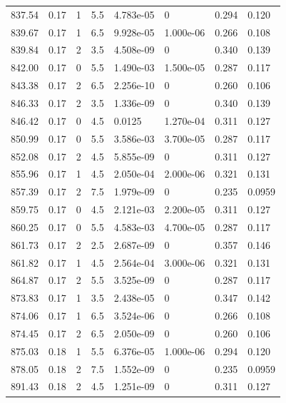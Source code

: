 \documentclass[preview]{standalone}
\begin{document}
{{{{{{{{{\begin{tabular}{L{1.2cm}C{1.2cm} C{0.3cm}C{0.5cm} C{1.4cm}C{1.4cm} C{1.4cm}C{1.4cm}}
  837.54  &  0.17  & 1     & 5.5 &  4.783e-05  & 0  & 0.294 &  0.120   \\ 
  839.67  &  0.17  & 1     & 6.5 &  9.928e-05  & 1.000e-06  & 0.266 &  0.108   \\ 
  839.84  &  0.17  & 2     & 3.5 &  4.508e-09  & 0  & 0.340 &  0.139   \\ 
  842.00  &  0.17  & 0     & 5.5 &  1.490e-03  & 1.500e-05  & 0.287 &  0.117   \\ 
  843.38  &  0.17  & 2     & 6.5 &  2.256e-10  & 0  & 0.260 &  0.106   \\ 
  846.33  &  0.17  & 2     & 3.5 &  1.336e-09  & 0  & 0.340 &  0.139   \\ 
  846.42  &  0.17  & 0     & 4.5 &  0.0125  & 1.270e-04  & 0.311 &  0.127   \\ 
  850.99  &  0.17  & 0     & 5.5 &  3.586e-03  & 3.700e-05  & 0.287 &  0.117   \\ 
  852.08  &  0.17  & 2     & 4.5 &  5.855e-09  & 0  & 0.311 &  0.127   \\ 
  855.96  &  0.17  & 1     & 4.5 &  2.050e-04  & 2.000e-06  & 0.321 &  0.131   \\ 
  857.39  &  0.17  & 2     & 7.5 &  1.979e-09  & 0  & 0.235 &  0.0959   \\ 
  859.75  &  0.17  & 0     & 4.5 &  2.121e-03  & 2.200e-05  & 0.311 &  0.127   \\ 
  860.25  &  0.17  & 0     & 5.5 &  4.583e-03  & 4.700e-05  & 0.287 &  0.117   \\ 
  861.73  &  0.17  & 2     & 2.5 &  2.687e-09  & 0  & 0.357 &  0.146   \\ 
  861.82  &  0.17  & 1     & 4.5 &  2.564e-04  & 3.000e-06  & 0.321 &  0.131   \\ 
  864.87  &  0.17  & 2     & 5.5 &  3.525e-09  & 0  & 0.287 &  0.117   \\ 
  873.83  &  0.17  & 1     & 3.5 &  2.438e-05  & 0  & 0.347 &  0.142   \\ 
  874.06  &  0.17  & 1     & 6.5 &  3.524e-06  & 0  & 0.266 &  0.108   \\ 
  874.45  &  0.17  & 2     & 6.5 &  2.050e-09  & 0  & 0.260 &  0.106   \\ 
  875.03  &  0.18  & 1     & 5.5 &  6.376e-05  & 1.000e-06  & 0.294 &  0.120   \\ 
  878.05  &  0.18  & 2     & 7.5 &  1.552e-09  & 0  & 0.235 &  0.0959   \\ 
  891.43  &  0.18  & 2     & 4.5 &  1.251e-09  & 0  & 0.311 &  0.127   \\ 

\end{tabular}}}}}}}}}}
\end{document}
